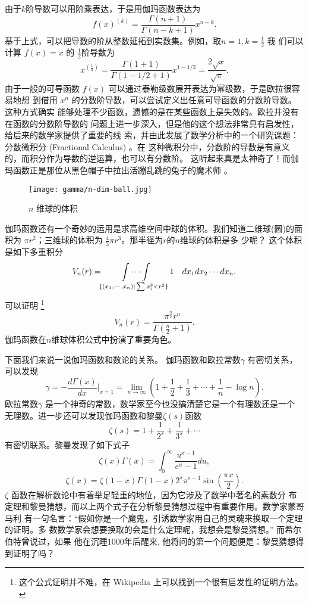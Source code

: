 {由于$k$阶导数可以用阶乘表达，于是用伽玛函数表达为
$$ f(x)^{(k)} = \frac{\Gamma{(n+1)}}{\Gamma{(n-k+1)}} x^{n-k} .$$
基于上式，可以把导数的阶从整数延拓到实数集。例如，取$n=1, k=\frac{1}{2}$ 我
们可以计算 $f(x)=x$ 的 $\frac{1}{2}$阶导数为
$$ x^{(\frac{1}{2})} = \frac{\Gamma{(1+1)}}{\Gamma{(1-1/2+1)}} x^{1-1/2} 
= \frac{2\sqrt{x}}{\sqrt{\pi}} .$$
由于一般的可导函数 $f(x)$ 可以通过泰勒级数展开表达为幂级数，于是欧拉很容易地想
到借用 $x^n$ 的分数阶导数，可以尝试定义出任意可导函数的分数阶导数。这种方式确实
能够处理不少函数，遗憾的是在某些函数上是失效的。欧拉并没有在函数的分数阶导数的
问题上进一步深入，但是他的这个想法非常具有启发性，给后来的数学家提供了重要的线
索，并由此发展了数学分析中的一个研究课题：分数微积分 (Fractional Calculus) 。在
这种微积分中，分数阶的导数是有意义的，而积分作为导数的逆运算，也可以有分数阶。
这听起来真是太神奇了！而伽玛函数正是那位从黑色帽子中拉出活蹦乱跳的兔子的魔术师
。

\begin{figure}[htbp]
\centering
\texttt{[image: gamma/n-dim-ball.jpg]}
\caption{$n$ 维球的体积}
\end{figure}

伽玛函数还有一个奇妙的运用是求高维空间中球的体积。我们知道二维球(圆)的面积为
$\pi r^2$；三维球的体积为 $\frac{4}{3} \pi r^3$。那半径为$r$的$n$维球的体积是多
少呢？ 这个体积是如下多重积分
$$ \displaystyle V_n(r) = \idotsint\limits_{ \tiny \{(x_1, \cdots, x_n) | \sum x_i^2 < r^2 \} }  1 \quad dx_1dx_2 \cdots dx_n  .$$
可以证明 \footnote{ 这个公式证明并不难，在 Wikipedia 上可以找到一个很有启发性的证明方法。}
$$ V_n(r) = \frac{\pi^{\frac{n}{2}} r^n}{\Gamma(\frac{n}{2} + 1)} .$$ 
伽玛函数在$n$维球体积公式中扮演了重要角色。 

下面我们来说一说伽玛函数和数论的关系。 伽玛函数和欧拉常数$\gamma$ 有密切关系，
可以发现
$$ \gamma = -\frac{d\Gamma(x)}{dx}|_{x=1} =
\lim_{n\rightarrow \infty}(1+\frac{1}{2} + \frac{1}{3}+\cdots+\frac{1}{n} - \log n) . $$
欧拉常数$\gamma$ 是一个神奇的常数，数学家至今也没搞清楚它是一个有理数还是一个
无理数。进一步还可以发现伽玛函数和黎曼$\zeta(s)$函数
$$ \zeta(s) = 1+\frac{1}{2^s} + \frac{1}{3^s} + \cdots $$
有密切联系。黎曼发现了如下式子
$$ \zeta(x) \Gamma(x) = \int_0^\infty \frac{u^{x-1}}{e^u - 1} du ,$$
$$ \zeta(x) = \zeta(1-x) \Gamma(1-x) 2^s \pi^{s-1} \sin\left(\frac{\pi x}{2}\right)  .$$
$\zeta$ 函数在解析数论中有着举足轻重的地位，因为它涉及了数学中著名的素数分
布定理和黎曼猜想，而以上两个式子在分析黎曼猜想过程中有重要作用。数学家蒙哥马利
有一句名言：“假如你是一个魔鬼，引诱数学家用自己的灵魂来换取一个定理的证明。多
数数学家会想要换取的会是什么定理呢，我想会是黎曼猜想。” 而希尔伯特曾说过，如果
他在沉睡1000年后醒来, 他将问的第一个问题便是：黎曼猜想得到证明了吗？

}

